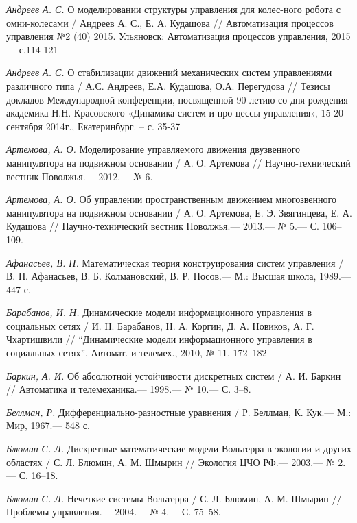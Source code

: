 \begin{thebibliography}{10}
	{\it Андреев А. С.} О моделировании структуры управления для колес-ного робота с омни-колесами / Андреев А. С., Е. А. Кудашова // Автоматизация процессов управления №2 (40) 2015. Ульяновск: Автоматизация процессов управления, 2015 — с.114-121
	
	
	{\it Андреев А. С.} О стабилизации движений механических систем управлениями различного типа / А.С. Андреев, Е.А. Кудашова, О.А. Перегудова // Тезисы докладов Международной конференции, посвященной 90-летию со дня рождения академика Н.Н. Красовского «Динамика систем и про-цессы управления», 15-20 сентября 2014г., Екатеринбург. – с. 35-37

	
	{\it Артемова, А. О.} Моделирование управляемого движения двузвенного манипулятора на подвижном основании /
	А. О. Артемова // Научно-технический вестник Поволжья.— 2012.— № 6.
	
	{\it Артемова, А. О.} Об управлении пространственным движением многозвенного манипулятора на подвижном основании /
	А. О. Артемова, Е. Э. Звягинцева, Е. А. Кудашова // Научно-технический вестник Поволжья.— 2013.— № 5.— С. 106–109.
	
	{\it Афанасьев, В. Н.} Математическая теория конструирования систем управления /
	В. Н. Афанасьев, В. Б. Колмановский, В. Р. Носов.— М.: Высшая школа, 1989.— 447 с.

	{\it Барабанов, И. Н.} Динамические модели информационного управления в социальных сетях / И. Н. Барабанов, Н. А. Коргин, Д. А. Новиков, А. Г. Чхартишвили // “Динамические модели информационного управления в социальных сетях”, Автомат. и телемех., 2010, № 11, 172–182
	
	
	{\it Баркин, А. И.} Об абсолютной устойчивости дискретных систем / А. И. Баркин // Автоматика и телемеханика.— 1998.— № 10.— С. 3–8.
	
	{\it Беллман, Р.} Дифференциально-разностные уравнения / Р. Беллман, К. Кук.— М.: Мир,
	1967.— 548 с.
	
	{\it Блюмин С. Л.} Дискретные математические модели Вольтерра в экологии и других областях /
	С. Л. Блюмин, А. М. Шмырин // Экология ЦЧО РФ.— 2003.— № 2.—
	С. 16–18.
	
	{\it Блюмин С. Л.} Нечеткие системы Вольтерра /
	С. Л. Блюмин, А. М. Шмырин // Проблемы управления.— 2004.— № 4.—
	С. 75–58.
	

\end{thebibliography}
